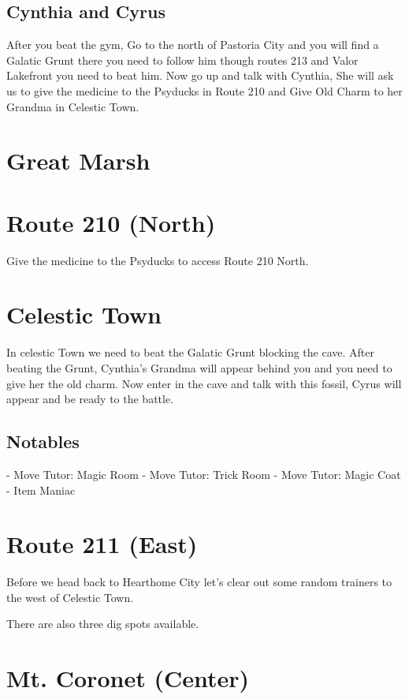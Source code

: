 \documentclass[11pt]{article}
\begin{document}
\subsection{Cynthia and Cyrus}\label{subsec:cynthia-and-cyrus}
After you beat the gym, Go to the north of Pastoria City
and you will find a Galatic Grunt there you need to follow him though routes 213
and Valor Lakefront you need to beat him.
Now go up and talk with Cynthia, She will ask us to give the medicine to the
Psyducks in Route 210 and Give Old Charm to her Grandma in Celestic Town.

\section{Great Marsh}
\label{sec:Great_Marsh}


\section{Route 210 (North)}\label{sec:route-210-(north)}
Give the medicine to the Psyducks to access Route 210 North.

\section{Celestic Town}\label{sec:celestic-town}
In celestic Town we need to beat the Galatic Grunt blocking the cave.
After beating the Grunt, Cynthia's Grandma will appear behind you
and you need to give her the old charm.
Now enter in the cave and talk with this fossil, Cyrus will appear and be ready to the battle.

\subsection{Notables}\label{subsec:notables-celestic}
- Move Tutor: Magic Room
- Move Tutor: Trick Room
- Move Tutor: Magic Coat
- Item Maniac

\section{Route 211 (East)}\label{sec:Route_211_(East)}
Before we head back to Hearthome City let's clear out some random trainers to
the west of Celestic Town.

There are also three dig spots available.

\section{Mt. Coronet (Center)}
\end{document}
